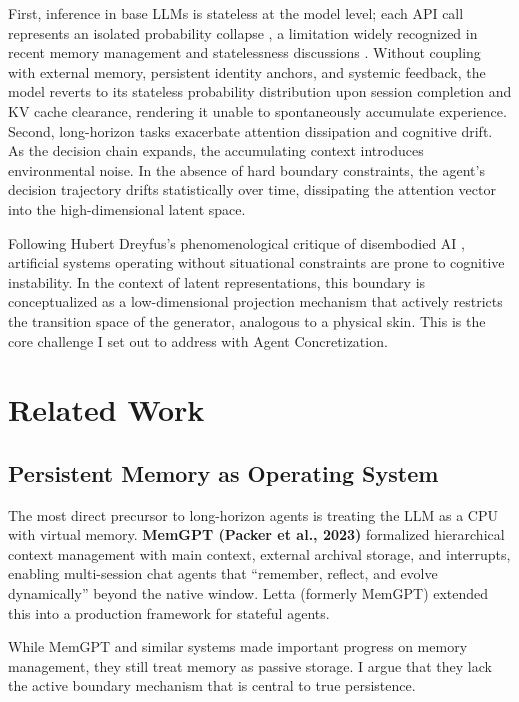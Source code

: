 \documentclass[10pt,journal,compsoc]{IEEEtran}
\begin{document}
First, inference in base LLMs is stateless at the model level; each API call represents an isolated probability collapse \cite{vaswani2017}, a limitation widely recognized in recent memory management and statelessness discussions \cite{packer2023, luo2026, zhang2024survey}. Without coupling with external memory, persistent identity anchors, and systemic feedback, the model reverts to its stateless probability distribution upon session completion and KV cache clearance, rendering it unable to spontaneously accumulate experience. Second, long-horizon tasks exacerbate attention dissipation and cognitive drift. As the decision chain expands, the accumulating context introduces environmental noise. In the absence of hard boundary constraints, the agent's decision trajectory drifts statistically over time, dissipating the attention vector into the high-dimensional latent space.

Following Hubert Dreyfus's phenomenological critique of disembodied AI \cite[p.156]{dreyfus1972}, artificial systems operating without situational constraints are prone to cognitive instability. In the context of latent representations, this boundary is conceptualized as a low-dimensional projection mechanism that actively restricts the transition space of the generator, analogous to a physical skin. This is the core challenge I set out to address with Agent Concretization.

\section{Related Work}

\subsection{Persistent Memory as Operating System}
The most direct precursor to long-horizon agents is treating the LLM as a CPU with virtual memory. \textbf{MemGPT (Packer et al., 2023)} \cite{packer2023} formalized hierarchical context management with main context, external archival storage, and interrupts, enabling multi-session chat agents that ``remember, reflect, and evolve dynamically'' beyond the native window. Letta (formerly MemGPT) extended this into a production framework for stateful agents.

While MemGPT and similar systems made important progress on memory management, they still treat memory as passive storage. I argue that they lack the active boundary mechanism that is central to true persistence.
\end{document}
